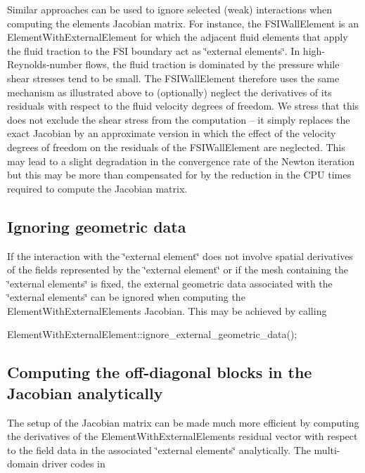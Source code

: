 Similar approaches can be used to ignore selected (weak) interactions when computing the element\textquotesingle{}s Jacobian matrix. For instance, the {\ttfamily F\+S\+I\+Wall\+Element} is an {\ttfamily Element\+With\+External\+Element} for which the adjacent fluid elements that apply the fluid traction to the F\+SI boundary act as \char`\"{}external elements\char`\"{}. In high-\/\+Reynolds-\/number flows, the fluid traction is dominated by the pressure while shear stresses tend to be small. The {\ttfamily F\+S\+I\+Wall\+Element} therefore uses the same mechanism as illustrated above to (optionally) neglect the derivatives of its residuals with respect to the fluid velocity degrees of freedom. We stress that this does not exclude the shear stress from the computation -- it simply replaces the exact Jacobian by an approximate version in which the effect of the velocity degrees of freedom on the residuals of the {\ttfamily F\+S\+I\+Wall\+Element} are neglected. This may lead to a slight degradation in the convergence rate of the Newton iteration but this may be more than compensated for by the reduction in the C\+PU times required to compute the Jacobian matrix.



\hypertarget{index_restricting_geom_data}{}\subsection{Ignoring geometric data}\label{index_restricting_geom_data}
If the interaction with the \char`\"{}external element\char`\"{} does not involve spatial derivatives of the fields represented by the \char`\"{}external element\char`\"{} or if the mesh containing the \char`\"{}external elements\char`\"{} is fixed, the external geometric data associated with the \char`\"{}external elements\char`\"{} can be ignored when computing the {\ttfamily Element\+With\+External\+Element\textquotesingle{}s} Jacobian. This may be achieved by calling


\begin{DoxyCode}
ElementWithExternalElement::ignore\_external\_geometric\_data();
\end{DoxyCode}




\hypertarget{index_analytical_jacobian}{}\subsection{Computing the off-\/diagonal blocks in the Jacobian analytically}\label{index_analytical_jacobian}
The setup of the Jacobian matrix can be made much more efficient by computing the derivatives of the {\ttfamily Element\+With\+External\+Elements\textquotesingle{}} residual vector with respect to the field data in the associated \char`\"{}external elements\char`\"{} analytically. The multi-\/domain driver codes in

